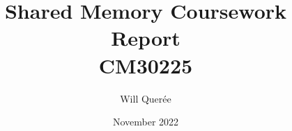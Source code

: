 \documentclass{article}
\title{\textbf{Shared Memory Coursework Report}\\CM30225}
\author{Will Quer\'ee}
\date{November 2022}
\begin{document}
\maketitle



\break



\break



\break



\break



\break


\end{document}
